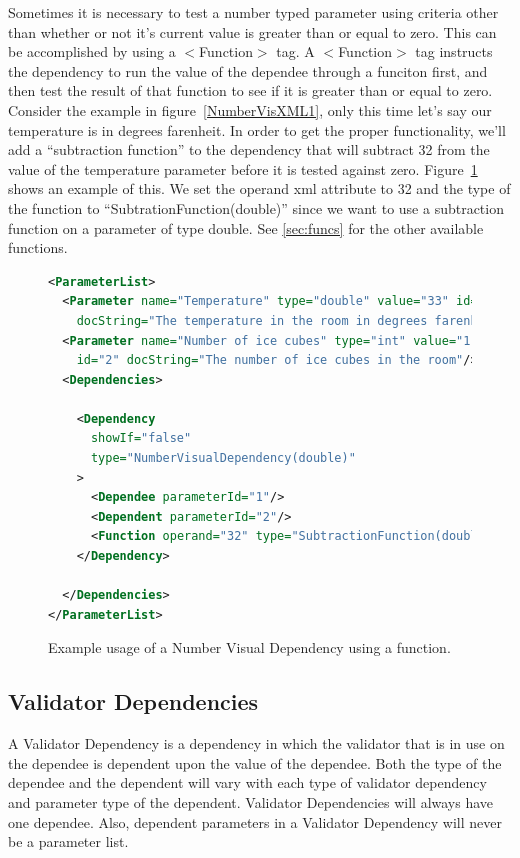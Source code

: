 Sometimes it is necessary to test a number typed parameter using criteria other than whether or not it's current value is greater than or equal to zero.
This can be accomplished by using a $<$Function$>$ tag. A $<$Function$>$ tag instructs the dependency to run the value of the dependee through a funciton
first, and then test the result of that function to see if it is greater than or equal to zero. Consider the example in figure~\ref{NumberVisXML1}, only this
time let's say our temperature is in degrees farenheit. In order to get the proper functionality, we'll add a ``subtraction function'' to the dependency that will
subtract 32 from the value of the temperature parameter before it is tested against zero. Figure~\ref{NumberVisXML2} shows an example of this. We set the operand 
xml attribute to 32 and the type of the function to ``SubtrationFunction(double)'' since we want to use a subtraction function on a parameter of type double. See
\ref{sec:funcs} for the other available functions.
\begin{figure}
\centering
\begin{lstlisting}[language=XML]
<ParameterList>
  <Parameter name="Temperature" type="double" value="33" id="1" 
    docString="The temperature in the room in degrees farenheit"/>
  <Parameter name="Number of ice cubes" type="int" value="1"
    id="2" docString="The number of ice cubes in the room"/>
  <Dependencies>

    <Dependency 
      showIf="false" 
      type="NumberVisualDependency(double)"
    >
      <Dependee parameterId="1"/>
      <Dependent parameterId="2"/>
      <Function operand="32" type="SubtractionFunction(double)"/> 
    </Dependency>

  </Dependencies>
</ParameterList>
\end{lstlisting}
\caption{Example usage of a Number Visual Dependency using a function.}
\label{NumberVisXML2}
\end{figure}

\subsection{Validator Dependencies}
A Validator Dependency is a dependency in which the validator that is in use on the dependee is dependent upon the value of the dependee. Both the type of
the dependee and the dependent will vary with each type of validator dependency and parameter type of the dependent. Validator Dependencies will always have
one dependee. Also, dependent parameters in a Validator Dependency will never be a parameter list.

